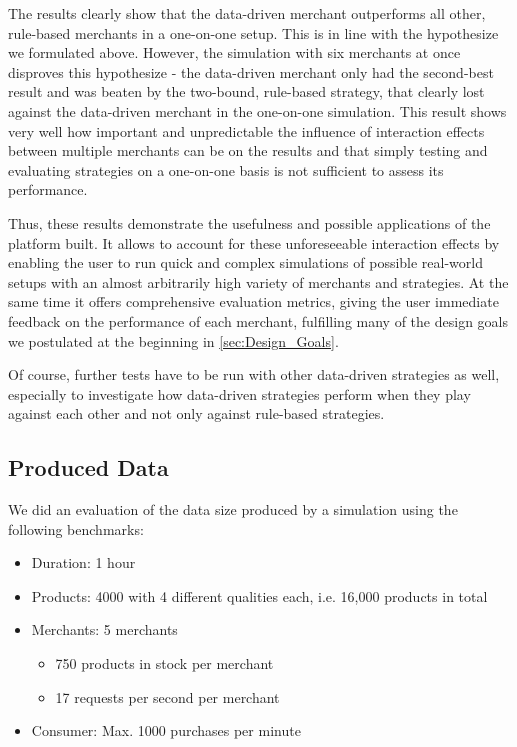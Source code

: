 The results clearly show that the data-driven merchant outperforms all other, rule-based merchants in a one-on-one setup. This is in line with the hypothesize we formulated above. However, the simulation with six merchants at once disproves this hypothesize - the data-driven merchant only had the second-best result and was beaten by the two-bound, rule-based strategy, that clearly lost against the data-driven merchant in the one-on-one simulation. 
This result shows very well how important and unpredictable the influence of interaction effects between multiple merchants can be on the results and that simply testing and evaluating strategies on a one-on-one basis is not sufficient to assess its performance.

Thus, these results demonstrate the usefulness and possible applications of the platform built. It allows to account for these unforeseeable interaction effects by enabling the user to run quick and complex simulations of possible real-world setups with an almost arbitrarily high variety of merchants and strategies. At the same time it offers comprehensive evaluation metrics, giving the user immediate feedback on the performance of each merchant, fulfilling many of the design goals we postulated at the beginning in \cref{sec:Design_Goals}. 

Of course, further tests have to be run with other data-driven strategies as well, especially to investigate how data-driven strategies perform when they play against each other and not only against rule-based strategies. 


%
\subsection{Produced Data}
%

We did an evaluation of the data size produced by a simulation using the following benchmarks:
\begin{itemize}
    \item Duration: 1 hour
    \item Products: 4000 with 4 different qualities each, i.e. 16,000 products in total
    \item Merchants: 5 merchants
    \begin{itemize}[nosep]
        \item 750 products in stock per merchant
        \item 17 requests per second per merchant
    \end{itemize}
    \item Consumer: Max. 1000 purchases per minute
\end{itemize}


